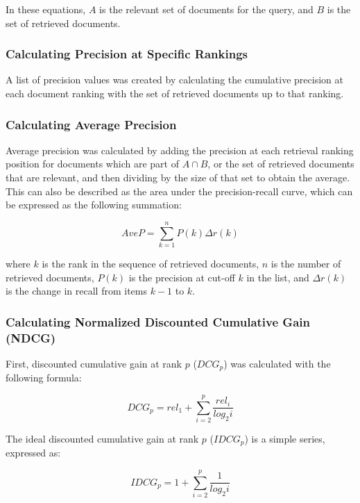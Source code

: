 In these equations, \(A\) is the relevant set of documents for the query, and \(B\) is the set of retrieved documents.


\subsubsection{Calculating Precision at Specific Rankings}
A list of precision values was created by calculating the cumulative precision at each document ranking with the set of retrieved documents up to that ranking.


\subsubsection{Calculating Average Precision}
Average precision was calculated by adding the precision at each retrieval ranking position for documents which are part of \(A \cap B\), or the set of retrieved documents that are relevant, and then dividing by the size of that set to obtain the average.  This can also be described as the area under the precision-recall curve, which can be expressed as the following summation:

\begin{equation}
\nonumber
AveP = \sum_{k=1}^{n} P(k)\Delta r(k)
\end{equation}

where \(k\) is the rank in the sequence of retrieved documents, \(n\) is the number of retrieved documents, \(P(k)\) is the precision at cut-off \(k\) in the list, and \(\Delta r(k)\) is the change in recall from items \(k-1\) to \(k\).


\subsubsection{Calculating Normalized Discounted Cumulative Gain (NDCG)}
First, discounted cumulative gain at rank \(p\) (\(DCG_p\)) was calculated with the following formula:

\begin{equation}
\nonumber
DCG_p = rel_1 + \sum_{i=2}^p \frac{rel_i}{log_2i}
\end{equation}

The ideal discounted cumulative gain at rank \(p\) (\(IDCG_p\)) is a simple series, expressed as:

\begin{equation}
\nonumber
IDCG_p = 1 + \sum_{i=2}^p \frac{1}{log_2i}
\end{equation}

